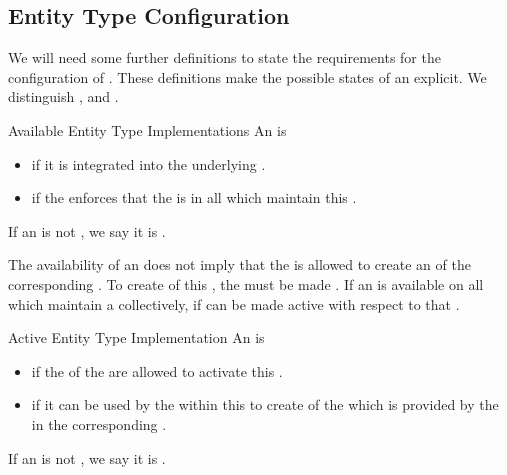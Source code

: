 \documentclass[a4paper, 12pt]{book}
\begin{document}
\subsection{Entity Type Configuration}
\label{sec:entity-type-representation:def:entity-type-configuration}

We will need some further definitions to state the requirements for the
configuration of . These definitions make the
possible states of an  explicit. We distinguish
,  and  .

\begin{definition*}{Available Entity Type Implementations}
  \label{def:available-entity-type-implementation}
  An  is 
  \begin{itemize}
  \item {} if it is integrated into
    the underlying \SYNEIGHT.
  \item {} if the \SYNEIGHT enforces that
    the  is  in all
     which maintain this .
  \end{itemize}
  If an  is not , we say it is
  . 
\end{definition*}
%
The availability of an  does not imply
that the  is allowed to create an  of the
corresponding . To create  of this , the  must be made .
%
If an  is available on all  which maintain a  collectively, if can be made
active with respect to that .
\begin{definition*}{Active Entity Type Implementation}
  An  is  
  \begin{itemize}
  \item {} if the  of the
     are allowed to activate this
  .
  \item {} if it can
    be used by the  within this  to create
   of the  which is 
    provided by the  in the
    corresponding .
  \end{itemize}
  If an  is not , we say it is
  . 
\end{definition*}
\end{document}
